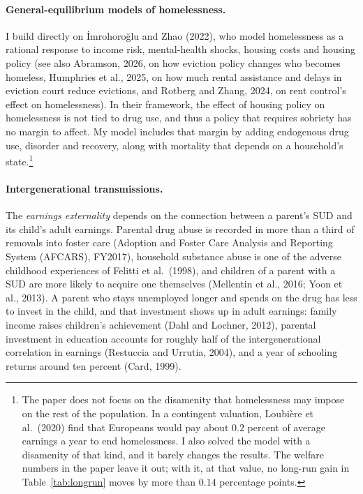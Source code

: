 \documentclass[10pt]{article}
\begin{document}
\paragraph{General-equilibrium models of homelessness.} I build directly on
\.{I}mrohoro\u{g}lu and Zhao (2022), who model homelessness as a rational
response to income risk, mental-health shocks, housing costs and housing policy (see also Abramson, 2026, on how eviction policy changes who becomes homeless, Humphries et al., 2025, on how much
rental assistance and delays in eviction court reduce evictions, and Rotberg and Zhang, 2024, on rent control's effect on homelessness).
  In their framework, the effect of housing policy on homelessness is not tied to drug use, and thus a policy that requires sobriety has no margin to affect. My model includes that margin by adding endogenous drug use, disorder and recovery, along with mortality that depends on a household's state.\footnote{\label{fn:kappax}The paper does not focus on the disamenity that homelessness may impose on the rest of the population. In a contingent valuation, Loubi\`ere et al.\ (2020) find that Europeans would pay about $0.2$ percent of average earnings a year to end homelessness. I also solved the model with a disamenity of that kind, and it barely changes the results. The welfare numbers in the paper leave it out; with it, at that value, no long-run gain in Table~\ref{tab:longrun} moves by more than $0.14$ percentage points.}

\paragraph{Intergenerational transmissions.}  The \emph{earnings externality} depends on the connection between a parent's SUD and its child's adult earnings. Parental drug abuse is recorded in more than a third of removals into foster care (Adoption and Foster Care Analysis and Reporting System (AFCARS), FY2017), household substance abuse is one of the adverse childhood experiences of Felitti et al.\ (1998), and children of a parent with a SUD are more likely to acquire one themselves (Mellentin et al., 2016; Yoon et al., 2013). A parent who stays unemployed longer and spends on the drug has less to invest in the child, and that investment shows up in adult earnings: family income raises children's achievement (Dahl and Lochner, 2012), parental investment in education accounts for roughly half of the intergenerational correlation in earnings (Restuccia and Urrutia, 2004), and a year of schooling returns around ten percent (Card, 1999).
\end{document}
